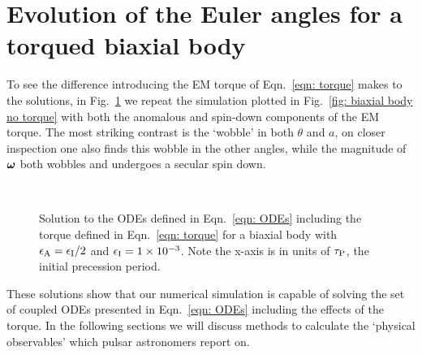 \documentclass[../full_thesis/full_thesis.tex]{subfiles}
\begin{document}
\section{Evolution of the Euler angles for a torqued biaxial body}
To see the difference introducing the EM torque of Eqn.~\eqref{eqn: torque}  makes to the
solutions, in Fig.~\ref{fig: biaxial body with torque} we repeat the simulation
plotted in Fig.~\ref{fig: biaxial body no torque} with both the anomalous
and spin-down components of the EM torque. The most
striking contrast is the `wobble' in both $\theta$ and $a$, on closer
inspection one also finds this wobble in the other angles, while the magnitude of
$\boldsymbol{\omega}$ both wobbles and undergoes a secular spin down.
\begin{figure}[ht]
    \centering
{} \\
\caption{Solution to the ODEs defined in Eqn.~\eqref{eqn: ODEs} including the
torque defined in Eqn.~\eqref{eqn: torque} for a biaxial body with
$\epsilon_{\mathrm{A}}=\epsilon_{\mathrm{I}}/2$ and $\epsilon_{\mathrm{I}}=1\times10^{-3}$. Note the x-axis is in units of
$\tau_{\mathrm{P}}$, the initial precession period.}
\label{fig: biaxial body with torque}
\end{figure}

These solutions show that our numerical simulation is capable of solving the
set of coupled ODEs presented in Eqn.~\eqref{eqn: ODEs} including the effects
of the torque. In the following sections we will discuss methods to calculate
the `physical observables' which pulsar astronomers report on.
\end{document}

